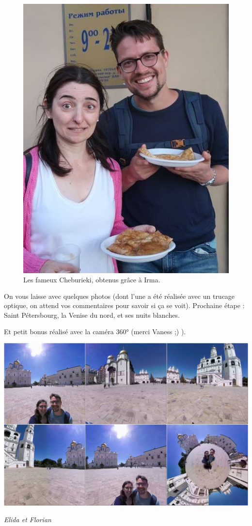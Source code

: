 \begin{figure}
\centering
\includegraphics{images/20180603_cheburieki.JPG}
\caption{Les fameux Cheburieki, obtenus grâce à Irma.}
\end{figure}

On vous laisse avec quelques photos (dont l'une a été réalisée avec un
trucage optique, on attend vos commentaires pour savoir si ça se voit).
Prochaine étape : Saint Pétersbourg, la Venise du nord, et ses nuits
blanches.

Et petit bonus réalisé avec la caméra 360° (merci Vaness ;) ).

\includegraphics{montage/russie.jpg}


\emph{Elida et Florian}
